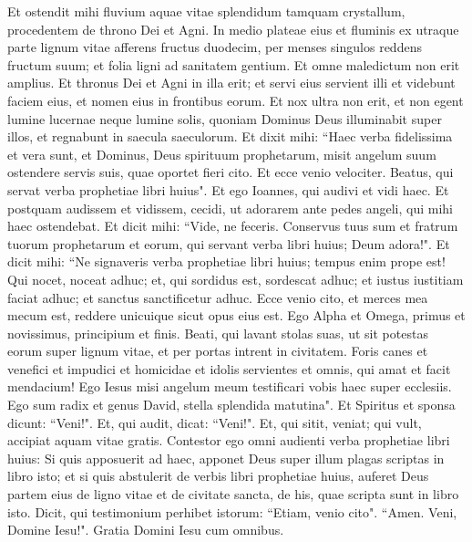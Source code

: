 \begin{biblechapter}  
\verse Et ostendit mihi fluvium aquae vitae splendidum tamquam crystallum, procedentem de throno Dei et Agni. 
\verse In medio plateae eius et fluminis ex utraque parte lignum vitae afferens fructus duodecim, per menses singulos reddens fructum suum; et folia ligni ad sanitatem gentium. 
\verse Et omne maledictum non erit amplius. Et thronus Dei et Agni in illa erit; et servi eius servient illi 
\verse et videbunt faciem eius, et nomen eius in frontibus eorum.  
\verse Et nox ultra non erit, et non egent lumine lucernae neque lumine solis, quoniam Dominus Deus illuminabit super illos, et regnabunt in saecula saeculorum. 
\verse Et dixit mihi: “Haec verba fidelissima et vera sunt, et Dominus, Deus spirituum prophetarum, misit angelum suum ostendere servis suis, quae oportet fieri cito. 
\verse Et ecce venio velociter. Beatus, qui servat verba prophetiae libri huius". 
\verse Et ego Ioannes, qui audivi et vidi haec. Et postquam audissem et vidissem, cecidi, ut adorarem ante pedes angeli, qui mihi haec ostendebat. 
\verse Et dicit mihi: “Vide, ne feceris. Conservus tuus sum et fratrum tuorum prophetarum et eorum, qui servant verba libri huius; Deum adora!". 
\verse Et dicit mihi: “Ne signaveris verba prophetiae libri huius; tempus enim prope est! 
\verse Qui nocet, noceat adhuc; et, qui sordidus est, sordescat adhuc; et iustus iustitiam faciat adhuc; et sanctus sanctificetur adhuc. 
\verse Ecce venio cito, et merces mea mecum est, reddere unicuique sicut opus eius est. 
\verse Ego Alpha et Omega, primus et novissimus, principium et finis.  
\verse Beati, qui lavant stolas suas, ut sit potestas eorum super lignum vitae, et per portas intrent in civitatem. 
\verse Foris canes et venefici et impudici et homicidae et idolis servientes et omnis, qui amat et facit mendacium! 
\verse Ego Iesus misi angelum meum testificari vobis haec super ecclesiis. Ego sum radix et genus David, stella splendida matutina". 
\verse Et Spiritus et sponsa dicunt: “Veni!". Et, qui audit, dicat: “Veni!". Et, qui sitit, veniat; qui vult, accipiat aquam vitae gratis. 
\verse Contestor ego omni audienti verba prophetiae libri huius: Si quis apposuerit ad haec, apponet Deus super illum plagas scriptas in libro isto; 
\verse et si quis abstulerit de verbis libri prophetiae huius, auferet Deus partem eius de ligno vitae et de civitate sancta, de his, quae scripta sunt in libro isto. 
\verse Dicit, qui testimonium perhibet istorum: “Etiam, venio cito". “Amen. Veni, Domine Iesu!". 
\verse Gratia Domini Iesu cum omnibus.
\end{biblechapter}
